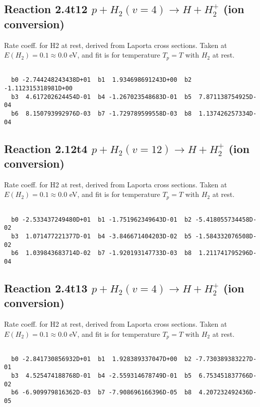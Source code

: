 \documentclass[12pt,dvipdfmx]{article}
\begin{document}
\newpage
\subsection{
Reaction 2.4t12
$ p + H_2(v=4) \rightarrow H + H_2^+$ (ion conversion)
}
Rate coeff. for H2 at rest, derived from Laporta cross sections.
Taken at $E(H_2) = 0.1 \approx 0.0$ eV,  and fit is for temperature $T_p=T$ with $H_2$ at rest.

\begin{small}\begin{verbatim}

  b0 -2.744248243438D+01  b1  1.934698691243D+00  b2 -1.112315318981D+00
  b3  4.617202624454D-01  b4 -1.267023548683D-01  b5  7.871138754925D-04
  b6  8.150793992976D-03  b7 -1.729789599558D-03  b8  1.137426257334D-04

\end{verbatim}\end{small}

\newpage
\subsection{
Reaction 2.12t4
$ p + H_2(v=12) \rightarrow H + H_2^+$ (ion conversion)
}
Rate coeff. for H2 at rest, derived from Laporta cross sections.
Taken at $E(H_2) = 0.1 \approx 0.0$ eV,  and fit is for temperature $T_p=T$ with $H_2$ at rest.

\begin{small}\begin{verbatim}

  b0 -2.533437249480D+01  b1 -1.751962349643D-01  b2 -5.418055734458D-02
  b3  1.071477221377D-01  b4 -3.846671404203D-02  b5 -1.584332076508D-02
  b6  1.039843683714D-02  b7 -1.920193147733D-03  b8  1.211741795296D-04

\end{verbatim}\end{small}

\newpage
\subsection{
Reaction 2.4t13
$ p + H_2(v=4) \rightarrow H + H_2^+$ (ion conversion)
}
Rate coeff. for H2 at rest, derived from Laporta cross sections.
Taken at $E(H_2) = 0.1 \approx 0.0$ eV,  and fit is for temperature $T_p=T$ with $H_2$ at rest.

\begin{small}\begin{verbatim}

  b0 -2.841730856932D+01  b1  1.928389337047D+00  b2 -7.730389383227D-01
  b3  4.525474188768D-01  b4 -2.559314678749D-01  b5  6.753451837766D-02
  b6 -6.909979816362D-03  b7 -7.908696166396D-05  b8  4.207232492436D-05

\end{verbatim}\end{small}
\end{document}

